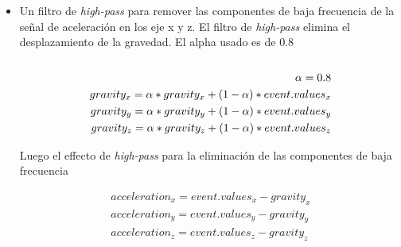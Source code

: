 \begin{itemize}
	\item  Un filtro de \emph{high-pass} para remover las componentes de baja frecuencia de la señal de aceleración en los eje x y z.  El filtro de \emph{high-pass}
	      elimina el desplazamiento de la gravedad. El alpha usado es de 0.8 \\\\
	      \begin{align*}
		      \alpha = 0.8                                                           \\
		      gravity_{x} = \alpha * gravity_x + (1-\alpha) *event.values_{x} \notag \\
		      gravity_{y} = \alpha * gravity_y + (1-\alpha) *event.values_{y} \notag \\
		      gravity_{z} = \alpha * gravity_z + (1-\alpha) *event.values_{z} \notag \\
	      \end{align*}

	      Luego el effecto de \emph{high-pass} para la eliminación de las componentes de baja frecuencia

	      \begin{align*}
		      acceleration_{x} =  event.values_{x} - gravity_{x} \\
		      acceleration_{y} = event.values_{y} - gravity_{y}  \\
		      acceleration_{z} = event.values_{z} - gravity_{z}
	      \end{align*}


\end{itemize}
